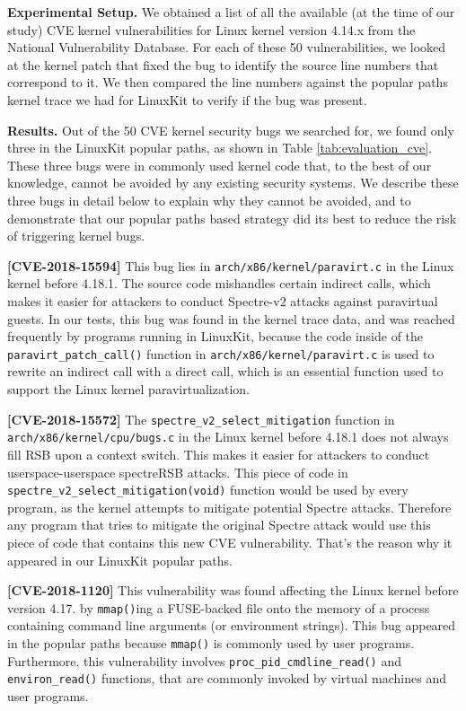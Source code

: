 \textbf{Experimental Setup.}
We obtained a list of all the available (at the time of our study) CVE kernel vulnerabilities for Linux kernel version 4.14.x from the National Vulnerability Database. 
For each of these 50 vulnerabilities, we looked at the kernel patch that fixed the bug to identify the source line numbers that correspond to it. 
We then compared the line numbers against the popular paths kernel trace we had for LinuxKit to verify if the bug was present.

\textbf{Results.}
Out of the 50 CVE kernel security bugs we searched for, we found only three in the LinuxKit popular paths, as shown in Table \ref{tab:evaluation_cve}. 
These three bugs were in commonly used kernel code that,   to the best of our knowledge, cannot be avoided by any existing security systems. 
We describe these three bugs in detail below to explain why they cannot be avoided, 
and to demonstrate that our popular paths based strategy did its best to reduce the risk of triggering kernel bugs.

\textbf{[CVE-2018-15594]}
This bug lies in \verb|arch/x86/kernel/paravirt.c| in the Linux kernel before 4.18.1. 
The source code mishandles certain indirect calls, which makes it easier for attackers to conduct Spectre-v2 attacks against paravirtual guests. 
In our tests, this bug was found in the  kernel trace data, and was reached frequently by programs running in LinuxKit, 
because the code inside of the \verb|paravirt_patch_call()| function in \verb|arch/x86/kernel/paravirt.c| is used to rewrite an indirect call with a direct call, 
which is an essential function used to support the Linux kernel paravirtualization. 

\textbf{[CVE-2018-15572]}
The \verb|spectre_v2_select_mitigation| function in \verb|arch/x86/kernel/cpu/bugs.c| in the Linux kernel before 4.18.1 does not always fill RSB upon a context switch. 
This makes it easier for attackers to conduct userspace-userspace spectreRSB attacks. 
This piece of code in \verb|spectre_v2_select_mitigation(void)| function would be used by every program, as the kernel attempts to mitigate potential Spectre attacks. 
Therefore any program that tries to mitigate the original Spectre attack would use this piece of code that contains this new CVE vulnerability. 
That's the reason why it appeared in our LinuxKit popular paths. 

\textbf{[CVE-2018-1120]}
This vulnerability was found affecting the Linux kernel before version 4.17. by \verb|mmap()|ing a FUSE-backed file onto 
the memory of a process containing command line arguments (or environment strings). 
This bug appeared in the popular paths because \verb|mmap()| is commonly used by user programs. 
Furthermore, this vulnerability involves \verb|proc_pid_cmdline_read()| and \verb|environ_read()| functions, that are commonly invoked by virtual machines and user programs.

